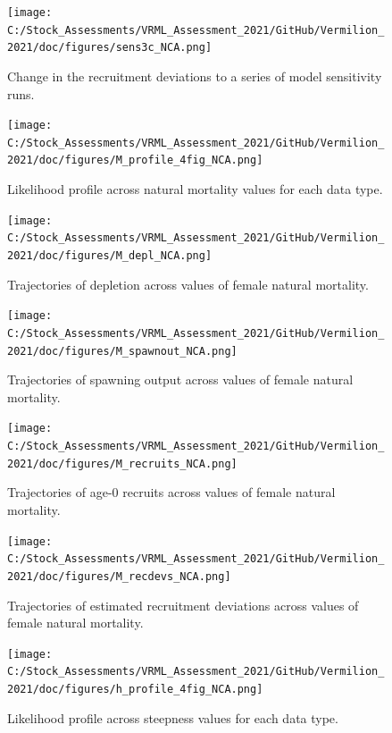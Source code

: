\documentclass[11pt,
  english,
]{article}
\begin{document}
\begin{figure}
\centering
\texttt{[image: C:/Stock\_Assessments/VRML\_Assessment\_2021/GitHub/Vermilion\_2021/doc/figures/sens3c\_NCA.png]}
\caption{Change in the recruitment deviations to a series of model sensitivity runs.\label{fig:sens3c}}
\end{figure}

\FloatBarrier

\begin{figure}
\centering
\texttt{[image: C:/Stock\_Assessments/VRML\_Assessment\_2021/GitHub/Vermilion\_2021/doc/figures/M\_profile\_4fig\_NCA.png]}
\caption{Likelihood profile across natural mortality values for each data type.\label{fig:m-profile}}
\end{figure}

\begin{figure}
\centering
\texttt{[image: C:/Stock\_Assessments/VRML\_Assessment\_2021/GitHub/Vermilion\_2021/doc/figures/M\_depl\_NCA.png]}
\caption{Trajectories of depletion across values of female natural mortality.\label{fig:m-depl}}
\end{figure}

\begin{figure}
\centering
\texttt{[image: C:/Stock\_Assessments/VRML\_Assessment\_2021/GitHub/Vermilion\_2021/doc/figures/M\_spawnout\_NCA.png]}
\caption{Trajectories of spawning output across values of female natural mortality.\label{fig:m-spawn}}
\end{figure}

\begin{figure}
\centering
\texttt{[image: C:/Stock\_Assessments/VRML\_Assessment\_2021/GitHub/Vermilion\_2021/doc/figures/M\_recruits\_NCA.png]}
\caption{Trajectories of age-0 recruits across values of female natural mortality.\label{fig:m-recruits}}
\end{figure}

\begin{figure}
\centering
\texttt{[image: C:/Stock\_Assessments/VRML\_Assessment\_2021/GitHub/Vermilion\_2021/doc/figures/M\_recdevs\_NCA.png]}
\caption{Trajectories of estimated recruitment deviations across values of female natural mortality.\label{fig:m-recdevs}}
\end{figure}

\begin{figure}
\centering
\texttt{[image: C:/Stock\_Assessments/VRML\_Assessment\_2021/GitHub/Vermilion\_2021/doc/figures/h\_profile\_4fig\_NCA.png]}
\caption{Likelihood profile across steepness values for each data type.\label{fig:h-profile}}
\end{figure}
\end{document}
